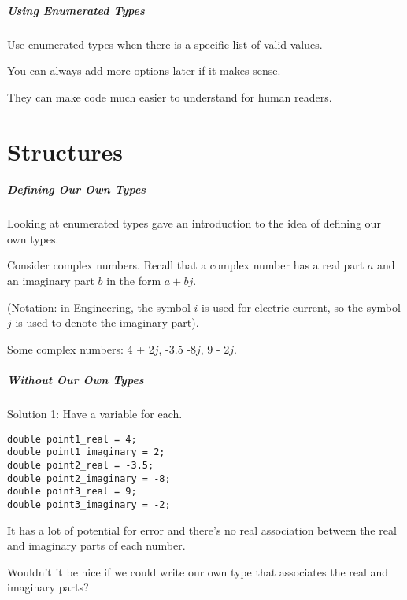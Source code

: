 \begin{frame}
\frametitle{Using Enumerated Types}

Use enumerated types when there is a specific list of valid values.

You can always add more options later if it makes sense.

They can make code much easier to understand for human readers.

\end{frame}

\part{Structures}
\begin{frame}\partpage\end{frame}

\begin{frame}
\frametitle{Defining Our Own Types}
Looking at enumerated types gave an introduction to the idea of defining our own types.

Consider complex numbers. Recall that a complex number has a real part $a$ and an imaginary part $b$ in the form $a + bj$. 

(Notation: in Engineering, the symbol $i$ is used for electric current, so the symbol $j$ is used to denote the imaginary part).

Some complex numbers: 4 + 2$j$, -3.5 -8$j$, 9 - 2$j$.

\end{frame}

\begin{frame}[fragile]
\frametitle{Without Our Own Types}
Solution 1: Have a variable for each.

\begin{verbatim}
double point1_real = 4;
double point1_imaginary = 2;
double point2_real = -3.5;
double point2_imaginary = -8;
double point3_real = 9;
double point3_imaginary = -2;

\end{verbatim}

It has a lot of potential for error and there's no real association between the real and imaginary parts of each number.

Wouldn't it be nice if we could write our own type that associates the real and imaginary parts?

\end{frame}


